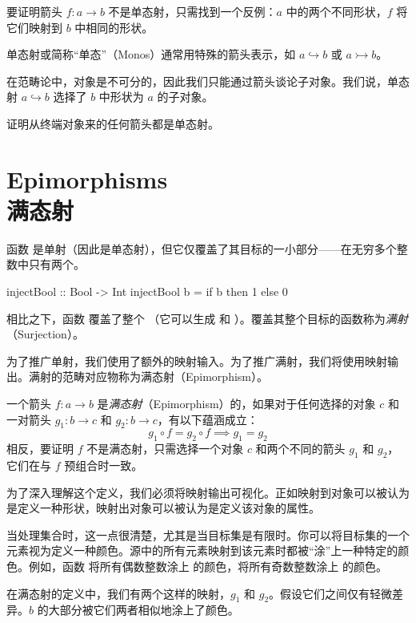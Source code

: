 \documentclass[DaoFP]{subfiles}
\begin{document}
    要证明箭头 $f \colon a \to b$ 不是单态射，只需找到一个反例：$a$ 中的两个不同形状，$f$ 将它们映射到 $b$ 中相同的形状。

    单态射或简称“单态”（Monos）通常用特殊的箭头表示，如 $a \hookrightarrow b$ 或 $a \rightarrowtail b$。

    在范畴论中，对象是不可分的，因此我们只能通过箭头谈论子对象。我们说，单态射 $a \hookrightarrow b$ 选择了 $b$ 中形状为 $a$ 的子对象。

    \begin{exercise}
        证明从终端对象来的任何箭头都是单态射。
    \end{exercise}

    \section{Epimorphisms\\满态射}

    函数  是单射（因此是单态射），但它仅覆盖了其目标的一小部分——在无穷多个整数中只有两个。
    \begin{haskell}
        injectBool :: Bool -> Int
        injectBool b = if b then 1 else 0
    \end{haskell}
    相比之下，函数  覆盖了整个 （它可以生成  和 ）。覆盖其整个目标的函数称为\emph{满射}（Surjection）。

    为了推广单射，我们使用了额外的映射输入。为了推广满射，我们将使用映射输出。满射的范畴对应物称为满态射（Epimorphism）。

    一个箭头 $f \colon a \to b$ 是\emph{满态射}（Epimorphism）的，如果对于任何选择的对象 $c$ 和一对箭头 $g_1 \colon b \to c$ 和 $g_2 \colon b \to c$，有以下蕴涵成立：
    \[ g_1 \circ f = g_2 \circ f \implies g_1 = g_2 \]
    相反，要证明 $f$ 不是满态射，只需选择一个对象 $c$ 和两个不同的箭头 $g_1$ 和 $g_2$，它们在与 $f$ 预组合时一致。

    为了深入理解这个定义，我们必须将映射输出可视化。正如映射到对象可以被认为是定义一种形状，映射出对象可以被认为是定义该对象的属性。

    当处理集合时，这一点很清楚，尤其是当目标集是有限时。你可以将目标集的一个元素视为定义一种颜色。源中的所有元素映射到该元素时都被“涂”上一种特定的颜色。例如，函数  将所有偶数整数涂上  的颜色，将所有奇数整数涂上  的颜色。

    在满态射的定义中，我们有两个这样的映射，$g_1$ 和 $g_2$。假设它们之间仅有轻微差异。$b$ 的大部分被它们两者相似地涂上了颜色。
\end{document}
